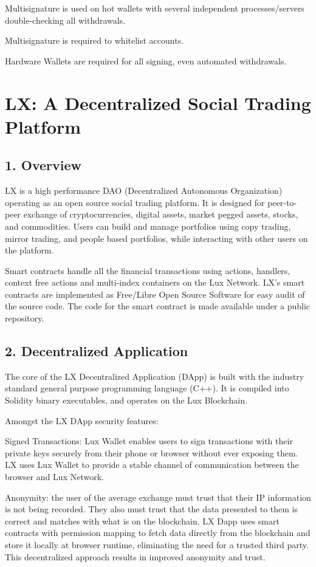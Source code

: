 \documentclass[11pt]{article}
\begin{document}
Multisignature is used on hot wallets with several independent processes/servers double-checking all withdrawals.


Multisignature is required to whitelist accounts.


Hardware Wallets are required for all signing, even automated withdrawals.


\section{LX: A Decentralized Social Trading Platform}

\subsection{1. Overview}

LX is a high performance DAO (Decentralized Autonomous Organization) operating as an open source social trading platform. It is designed for peer-to-peer exchange of cryptocurrencies, digital assets, market pegged assets, stocks, and commodities. Users can build and manage portfolios using copy trading, mirror trading, and people based portfolios, while interacting with other users on the platform.


Smart contracts handle all the financial transactions using actions, handlers, context free actions and multi-index containers on the Lux Network. LX's smart contracts are implemented as Free/Libre Open Source Software for easy audit of the source code. The code for the smart contract is made available under a public repository.


\subsection{2. Decentralized Application}

The core of the LX Decentralized Application (DApp) is built with the industry standard general purpose programming language (C++). It is compiled into Solidity binary executables, and operates on the Lux  Blockchain.


Amongst the LX DApp security features:


Signed Transactions: Lux Wallet enables users to sign transactions with their private keys securely from their phone or browser without ever exposing them. LX uses Lux Wallet to provide a stable channel of communication between the browser and Lux Network.


Anonymity: the user of the average exchange must trust that their IP information is not being recorded. They also must trust that the data presented to them is correct and matches with what is on the blockchain. LX Dapp uses smart contracts with permission mapping to fetch data directly from the blockchain and store it locally at browser runtime, eliminating the need for a trusted third party. This decentralized approach results in improved anonymity and trust.
\end{document}
